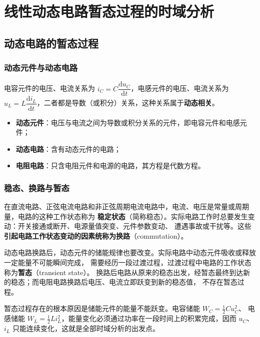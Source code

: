 \chapter{线性动态电路暂态过程的时域分析}

\section{动态电路的暂态过程}

\subsection{动态元件与动态电路}
电容元件的电压、电流关系为 $i_C=C\dfrac{\mathrm{d}u_C}{\mathrm{d}t}$，电感元件的电压、电流关系为
$u_L=L\dfrac{\mathrm{d}i_L}{\mathrm{d}t}$，二者都是导数（或积分）关系，这种关系属于\textbf{动态相关}。
\begin{itemize}
  \item \textbf{动态元件}：电压与电流之间为导数或积分关系的元件，即电容元件和电感元件；
  \item \textbf{动态电路}：含有动态元件的电路；
  \item \textbf{电阻电路}：只含电阻元件和电源的电路，其方程是代数方程。
\end{itemize}

\subsection{稳态、换路与暂态}
在直流电路、正弦电流电路和非正弦周期电流电路中，电流、电压是常量或周期量，电路的这种工作状态称为
\textbf{稳定状态}（简称稳态）。实际电路工作时总要发生变动：开关接通或断开、电源量值突变、元件参数变动、
遭遇事故或干扰等。这些\textbf{引起电路工作状态变动的因素统称为换路}（commutation）。

动态电路换路后，动态元件的储能规律也要改变。实际电路中动态元件吸收或释放一定能量不可能瞬间完成，
需要经历一段过渡过程，过渡过程中电路的工作状态称为\textbf{暂态}（transient state）。
换路后电路从原来的稳态出发，经暂态最终到达新的稳态；而电阻电路换路后电压、电流立即跃变到新的稳态值，
不存在暂态过程。

\begin{corepoint}{暂态过程存在的根本原因是储能元件的能量不能跃变。电容储能 $W_C=\tfrac12Cu_C^2$、
电感储能 $W_L=\tfrac12Li_L^2$，能量变化必须通过功率在一段时间上的积累完成，因而 $u_C$、$i_L$
只能连续变化，这就是全部时域分析的出发点。}
\end{corepoint}

